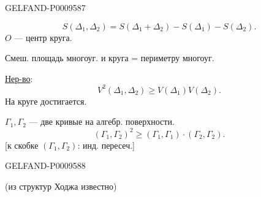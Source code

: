 \begin{GelfandAdjacentEvidence}{GELFAND-P000958}{7}

\begin{equation*}
 S(\Delta_1,\Delta_2)=S(\Delta_1+\Delta_2)-S(\Delta_1)-S(\Delta_2).
 \tag{17}
\end{equation*}
$O$ --- центр круга.

Смеш. площадь многоуг. и круга = периметру многоуг.

\underline{Нер-во}:
\begin{equation*}
 V^2(\Delta_1,\Delta_2)\geqslant V(\Delta_1)V(\Delta_2).
 \tag{18}
\end{equation*}
На круге достигается.


$\Gamma_1,\Gamma_2$ --- две кривые на алгебр. поверхности.
\begin{equation*}
 (\Gamma_1,\Gamma_2)^2\geqslant(\Gamma_1,\Gamma_1)\cdot(\Gamma_2,\Gamma_2).
 \tag{19}
\end{equation*}
[к скобке $(\Gamma_1,\Gamma_2)$: инд. пересеч.]
\end{GelfandAdjacentEvidence}
\begin{GelfandAdjacentEvidence}{GELFAND-P000958}{8}


(из структур Ходжа известно)
\end{GelfandAdjacentEvidence}


